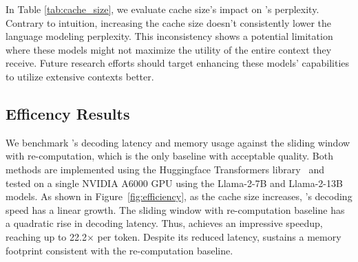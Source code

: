  In Table \ref{tab:cache_size}, we evaluate cache size's impact on \method's perplexity. Contrary to intuition, increasing the cache size doesn't consistently lower the language modeling perplexity. This inconsistency shows a potential limitation where these models might not maximize the utility of the entire context they receive. Future research efforts should target enhancing these models' capabilities to utilize extensive contexts better.


\subsection{Efficency Results}

We benchmark \method's decoding latency and memory usage against the sliding window with re-computation, which is the only baseline with acceptable quality. Both methods are implemented using the Huggingface Transformers library~\citep{wolf2020huggingfaces} and tested on a single NVIDIA A6000 GPU using the Llama-2-7B and Llama-2-13B models.
As shown in Figure~\ref{fig:efficiency}, as the cache size increases, \method's decoding speed has a linear growth. The sliding window with re-computation baseline has a quadratic rise in decoding latency. Thus, \method achieves an impressive speedup, reaching up to 22.2$\times$ per token. Despite its reduced latency, \method sustains a memory footprint consistent with the re-computation baseline.

